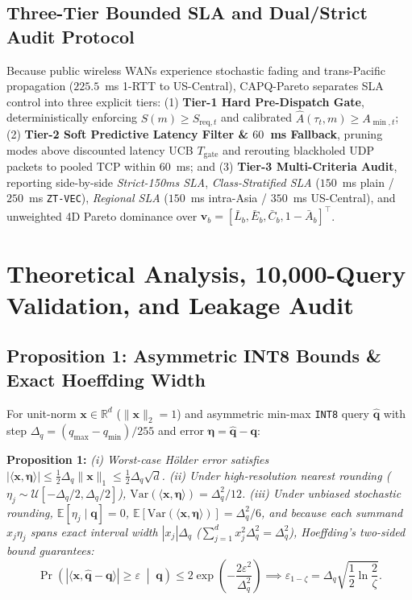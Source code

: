 \documentclass[10pt,journal,compsoc]{IEEEtran}
\begin{document}
\subsection{Three-Tier Bounded SLA and Dual/Strict Audit Protocol}
Because public wireless WANs experience stochastic fading and trans-Pacific propagation ($225.5$~ms 1-RTT to US-Central), CAPQ-Pareto separates SLA control into three explicit tiers: (1) \textbf{Tier-1 Hard Pre-Dispatch Gate}, deterministically enforcing $S(m) \ge S_{\mathrm{req},t}$ and calibrated $\hat{A}(\tau_t, m) \ge A_{\min,t}$; (2) \textbf{Tier-2 Soft Predictive Latency Filter \& $60$~ms Fallback}, pruning modes above discounted latency UCB $T_{\mathrm{gate}}$ and rerouting blackholed UDP packets to pooled TCP within $60$~ms; and (3) \textbf{Tier-3 Multi-Criteria Audit}, reporting side-by-side \emph{Strict-150ms SLA}, \emph{Class-Stratified SLA} ($150$~ms plain / $250$~ms \texttt{ZT-VEC}), \emph{Regional SLA} ($150$~ms intra-Asia / $350$~ms US-Central), and unweighted 4D Pareto dominance over $\mathbf{v}_b = [\bar{L}_b, \bar{E}_b, \bar{C}_b, 1-\bar{A}_b]^\top$.

\section{Theoretical Analysis, 10,000-Query Validation, and Leakage Audit}\label{sec:theory}
\subsection{Proposition 1: Asymmetric INT8 Bounds \& Exact Hoeffding Width}
For unit-norm $\mathbf{x} \in \mathbb{R}^d$ ($\|\mathbf{x}\|_2=1$) and asymmetric min-max \texttt{INT8} query $\hat{\mathbf{q}}$ with step $\Delta_q = (q_{\max}-q_{\min})/255$ and error $\boldsymbol{\eta} = \hat{\mathbf{q}}-\mathbf{q}$:

\textbf{Proposition 1:} \emph{(i) Worst-case H\"{o}lder error satisfies $|\langle \mathbf{x},\boldsymbol{\eta}\rangle| \le \frac{1}{2}\Delta_q\|\mathbf{x}\|_1 \le \frac{1}{2}\Delta_q\sqrt{d}$. (ii) Under high-resolution nearest rounding ($\eta_j \sim \mathcal{U}[-\Delta_q/2,\Delta_q/2]$), $\mathrm{Var}(\langle \mathbf{x},\boldsymbol{\eta}\rangle) = \Delta_q^2/12$. (iii) Under unbiased stochastic rounding, $\mathbb{E}[\eta_j \mid \mathbf{q}]=0$, $\mathbb{E}[\mathrm{Var}(\langle \mathbf{x},\boldsymbol{\eta}\rangle)] = \Delta_q^2/6$, and because each summand $x_j\eta_j$ spans exact interval width $|x_j|\Delta_q$ ($\sum_{j=1}^d x_j^2\Delta_q^2 = \Delta_q^2$), Hoeffding's two-sided bound guarantees:}
\begin{equation}
\Pr\!\left(\left|\langle \mathbf{x}, \hat{\mathbf{q}} - \mathbf{q}\rangle\right| \ge \varepsilon \;\middle|\; \mathbf{q}\right) \le 2\exp\!\left(-\frac{2\varepsilon^2}{\Delta_q^2}\right) \implies \varepsilon_{1-\zeta} = \Delta_q\sqrt{\frac{1}{2}\ln\frac{2}{\zeta}}.
\label{eq:hoeff_v4}
\end{equation}
\end{document}
